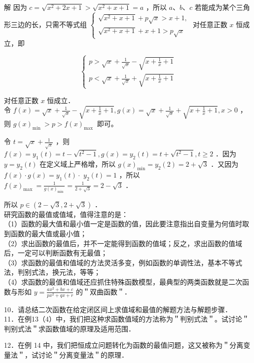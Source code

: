 \documentclass[10pt]{article}
\begin{document}
解 因为 \(c=\sqrt{x^{2}+2 x+1}>\sqrt{x^{2}+x+1}=a\) ，所以 \(a 、 b 、 c\) 若能成为某个三角形三边的长，只需不等式组 \(\left\{\begin{array}{l}\sqrt{x^{2}+x+1}+p \sqrt{x}>x+1, \\ \sqrt{x^{2}+x+1}+x+1>p \sqrt{x}\end{array}\right.\) 对任意正数 \(x\) 恒成立，即

\[
\left\{\begin{array}{l}
p>\sqrt{x}+\frac{1}{\sqrt{x}}-\sqrt{x+\frac{1}{x}+1} \\
p<\sqrt{x}+\frac{1}{\sqrt{x}}+\sqrt{x+\frac{1}{x}+1}
\end{array}\right.
\]

对任意正数 \(x\) 恒成立．\\
令 \(f(x)=\sqrt{x}+\frac{1}{\sqrt{x}}-\sqrt{x+\frac{1}{x}+1}, g(x)=\sqrt{x}+\frac{1}{\sqrt{x}}+\sqrt{x+\frac{1}{x}+1}, x>0\) ，则 \(g(x)_{\text {min }}>p>f(x)_{\text {max }}\) 即可。

令 \(t=\sqrt{x}+\frac{1}{\sqrt{x}}\) ，则 \(f(x)=y_{1}(t)=t-\sqrt{t^{2}-1}, g(x)=y_{2}(t)=t+\sqrt{t^{2}-1}, t \geqslant 2\) ．因为 \(y=y_{2}(t)\) 在定义域上严格增，所以 \(g(x)_{\min }=y_{2}(2)=2+\sqrt{3}\) ．又因为 \(f(x) \cdot g(x)=y_{1}(t) \cdot\) \(y_{2}(t)=1\) ，所以 \(f(x)_{\text {max }}=\frac{1}{g(x)_{\text {min }}}=\frac{1}{2+\sqrt{3}}=2-\sqrt{3}\) ．

所以 \(p \in(2-\sqrt{3}, 2+\sqrt{3})\) ．\\
研究函数的最值或值域，值得注意的是：\\
（1）函数的最大值和最小值一定是函数的值，因此要注意指出自变量为何值时取到函数的最大值或最小值；\\
（2）求出函数的最值后，并不一定能得到函数的值域；反之，求出函数的值域后，一定可以判断函数有无最值；\\
（3）求函数的最值和值域的方法灵活多变，例如函数的单调性法，基本不等式法，判别式法，换元法，等等；\\
（4）求函数的最值和值域还应抓住特殊函数模型，最典型的两类函数就是二次函数与形如 \(y=\frac{a x^{2}+b x+c}{p x^{2}+q x+r}\) 的＂双曲函数＂．

10．请总结二次函数在给定闭区间上求值域和最值的解题方法与解题步骤．\\
11．在例13（4）中，我们把这种求函数值域的方法称为＂判别式法＂。试讨论＂判别式法＂求函数值域的原理及适用范围．

12．在例 14 中，我们把恒成立问题转化为函数的最值问题，这又被称为＂分离变量法＂，试讨论＂分离变量法＂的原理．
\end{document}
